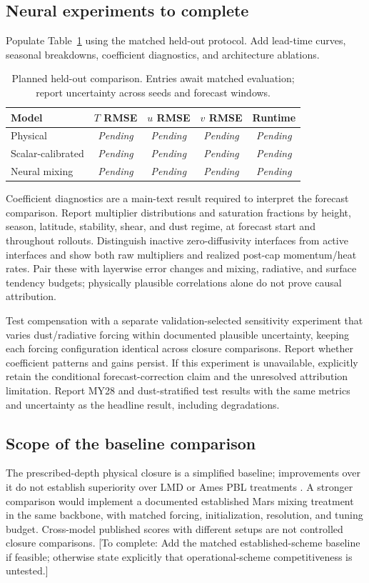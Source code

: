 \documentclass{article}
\newcommand{\pending}[1]{\textcolor{blue!65!black}{[To complete: #1]}}
\newcommand{\resultpending}{\textit{Pending}}
\begin{document}
\subsection{Neural experiments to complete}
Populate Table~\ref{tab:neural} using the matched held-out protocol. Add lead-time
curves, seasonal breakdowns, coefficient diagnostics, and architecture ablations.
\begin{table}[t]
\centering\small
\caption{Planned held-out comparison. Entries await matched evaluation;
report uncertainty across seeds and forecast windows.}
\begin{tabular}{lcccc}
\toprule
Model & \(T\) RMSE & \(u\) RMSE & \(v\) RMSE & Runtime\\
\midrule
Physical & \resultpending & \resultpending & \resultpending & \resultpending\\
Scalar-calibrated & \resultpending & \resultpending & \resultpending & \resultpending\\
Neural mixing & \resultpending & \resultpending & \resultpending & \resultpending\\
\bottomrule
\end{tabular}
\label{tab:neural}
\end{table}
Coefficient diagnostics are a main-text result required to interpret the
forecast comparison. Report multiplier distributions and saturation fractions
by height, season, latitude, stability, shear, and dust regime, at forecast
start and throughout rollouts. Distinguish inactive zero-diffusivity interfaces
from active interfaces and show both raw multipliers and realized post-cap
momentum/heat rates. Pair these with layerwise error changes and mixing,
radiative, and surface tendency budgets; physically plausible correlations
alone do not prove causal attribution.

Test compensation with a separate validation-selected sensitivity experiment
that varies dust/radiative forcing within documented plausible uncertainty,
keeping each forcing configuration identical across closure comparisons.
Report whether coefficient patterns and gains persist. If this experiment
is unavailable, explicitly retain the conditional forecast-correction claim
and the unresolved attribution limitation. Report MY28 and dust-stratified
test results with the same metrics and uncertainty as the headline result,
including degradations.

\subsection{Scope of the baseline comparison}
The prescribed-depth physical closure is a simplified baseline; improvements
over it do not establish superiority over LMD or Ames PBL treatments
\citep{forget1999improved,haberle2019ames}. A stronger comparison would implement
a documented established Mars mixing treatment in the same backbone, with
matched forcing, initialization, resolution, and tuning budget. Cross-model
published scores with different setups are not controlled closure comparisons.
\pending{Add the matched established-scheme baseline if feasible; otherwise
state explicitly that operational-scheme competitiveness is untested.}
\end{document}
